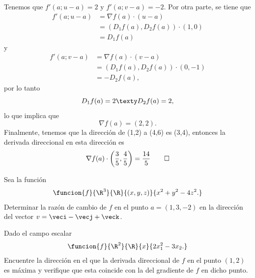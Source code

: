 \documentclass[a4,11pt]{aleph-examen}
\begin{document}
\begin{preguntas}
\begin{respuesta}
\begin{respuesta}
    \begin{respuesta}
    Tenemos que $f'(a;u-a)=2$ y $f'(a;v-a)=-2$. Por otra parte, se tiene que
    \begin{align*}
        f'(a;u-a) 
            & = \nabla f(a) \cdot (u-a) \\
            & = (D_1f(a),D_2f(a))\cdot (1,0) \\
            & = D_1f(a)
    \end{align*}
    y
    \begin{align*}
        f'(a;v-a) 
            & = \nabla f(a) \cdot (v-a) \\
            & = (D_1f(a),D_2f(a))\cdot (0,-1) \\
            & = -D_2f(a),
    \end{align*}
    por lo tanto
    \[
        D_1f(a)=2
        \texty
        D_2f(a)=2,
    \]
    lo que implica que
    \[
        \nabla f(a)=(2,2). 
    \]
    Finalmente, tenemos que la dirección de (1,2) a (4,6) es (3,4), entonces la derivada direccional en esta dirección es
    \[
        \nabla f(a) \cdot \left( \frac{3}{5},\frac{4}{5} \right)=\frac{14}{5} \qedhere
    \]
\end{respuesta} 



\item
    Sea la función
   		\[
            \funcion{f}{\R^3}{\R}{(x,y,z)}{x^2+y^2-4z^2.}
        \]
    Determinar la razón de cambio de $f$ en el punto $a=(1,3,-2)$ en la dirección del vector $v=\veci-\vecj+\veck$.

\item 
    Dado el campo escalar
	\[
		\funcion{f}{\R^2}{\R}{x}{2x_1^2-3x_2.}
	\]
	Encuentre la dirección en el que la derivada direccional de $f$ en el punto $(1,2)$ es máxima y verifique que esta coincide con la del gradiente de $f$ en dicho punto.


\end{respuesta}
\end{respuesta}
\end{preguntas}
\end{document}
